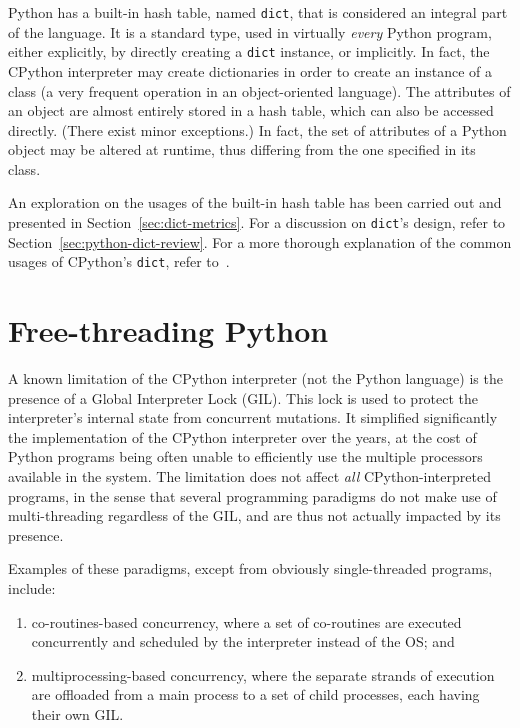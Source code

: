 Python has a built-in hash table, named \texttt{dict}, that is considered an integral part of the language.
It is a standard type, used in virtually \emph{every} Python program, either explicitly, by directly creating a \texttt{dict} instance, or implicitly.
In fact, the CPython interpreter may create dictionaries in order to create an instance of a class (a very frequent operation in an object-oriented language).
The attributes of an object are almost entirely stored in a hash table, which can also be accessed directly.
(There exist minor exceptions.)
In fact, the set of attributes of a Python object may be altered at runtime, thus differing from the one specified in its class.

An exploration on the usages of the built-in hash table has been carried out and presented in Section~\ref{sec:dict-metrics}.
For a discussion on \texttt{dict}'s design, refer to Section~\ref{sec:python-dict-review}.
For a more thorough explanation of the common usages of CPython's \texttt{dict}, refer to~\cite[\S Principal Use Cases for Dictionaries]{dict-notes}.


\section{Free-threading Python}\label{sec:free-threading}

A known limitation of the CPython interpreter (not the Python language) is the presence of a Global Interpreter Lock (GIL).
This lock is used to protect the interpreter's internal state from concurrent mutations.
It simplified significantly the implementation of the CPython interpreter over the years, at the cost of Python programs being often unable to efficiently use the multiple processors available in the system.
The limitation does not affect \emph{all} CPython-interpreted programs, in the sense that several programming paradigms do not make use of multi-threading regardless of the GIL, and are thus not actually impacted by its presence.

Examples of these paradigms, except from obviously single-threaded programs, include:
\begin{enumerate}
    \item co-routines-based concurrency, where a set of co-routines are executed concurrently and scheduled by the interpreter instead of the OS; and
    \item multiprocessing-based concurrency, where the separate strands of execution are offloaded from a main process to a set of child processes, each having their own GIL\@.
\end{enumerate}

